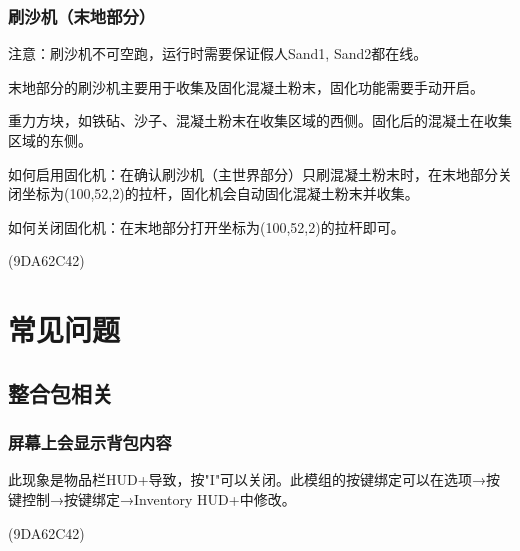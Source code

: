 \documentclass[UTF8,a4paper]{article}
\begin{document}
			\subsubsection{刷沙机（末地部分）}
				\par 注意：刷沙机不可空跑，运行时需要保证假人Sand1, Sand2都在线。
				\par 末地部分的刷沙机主要用于收集及固化混凝土粉末，固化功能需要手动开启。
				\par 重力方块，如铁砧、沙子、混凝土粉末在收集区域的西侧。固化后的混凝土在收集区域的东侧。
				\par 如何启用固化机：在确认刷沙机（主世界部分）只刷混凝土粉末时，在末地部分关闭坐标为(100,52,2)的拉杆，固化机会自动固化混凝土粉末并收集。
				\par 如何关闭固化机：在末地部分打开坐标为(100,52,2)的拉杆即可。
				\begin{flushright}(9DA62C42)\end{flushright}
	\section{常见问题}
		\subsection{整合包相关}
			\subsubsection{屏幕上会显示背包内容}
				\par 此现象是物品栏HUD+导致，按"I"可以关闭。此模组的按键绑定可以在选项→按键控制→按键绑定→Inventory HUD+中修改。
				\begin{flushright}(9DA62C42)\end{flushright}
\end{document}
